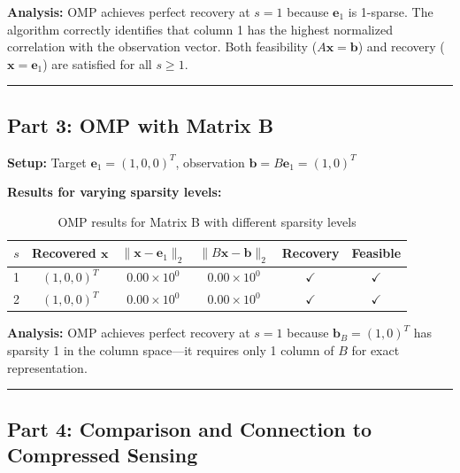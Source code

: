\textbf{Analysis:} OMP achieves perfect recovery at $s=1$ because $\mathbf{e}_1$ is 1-sparse. The algorithm correctly identifies that column 1 has the highest normalized correlation with the observation vector. Both feasibility ($A\mathbf{x} = \mathbf{b}$) and recovery ($\mathbf{x} = \mathbf{e}_1$) are satisfied for all $s \geq 1$.

\vspace{2em}
\noindent\rule{\textwidth}{0.4pt}

\clearpage
\subsection*{Part 3: OMP with Matrix B}

\textbf{Setup:} Target $\mathbf{e}_1 = (1, 0, 0)^T$, observation $\mathbf{b} = B\mathbf{e}_1 = (1, 0)^T$

\textbf{Results for varying sparsity levels:}

\begin{table}[h]
\centering
\begin{tabular}{cccccc}
\toprule
$s$ & Recovered $\mathbf{x}$ & $\|\mathbf{x} - \mathbf{e}_1\|_2$ & $\|B\mathbf{x} - \mathbf{b}\|_2$ & Recovery & Feasible \\
\midrule
1 & $(1, 0, 0)^T$ & $0.00 \times 10^{0}$ & $0.00 \times 10^{0}$ & $\checkmark$ & $\checkmark$ \\
2 & $(1, 0, 0)^T$ & $0.00 \times 10^{0}$ & $0.00 \times 10^{0}$ & $\checkmark$ & $\checkmark$ \\
\bottomrule
\end{tabular}
\caption{OMP results for Matrix B with different sparsity levels}
\end{table}

\textbf{Analysis:} OMP achieves perfect recovery at $s=1$ because $\mathbf{b}_B = (1, 0)^T$ has sparsity 1 in the column space—it requires only 1 column of $B$ for exact representation.

\vspace{2em}
\noindent\rule{\textwidth}{0.4pt}

\clearpage
\subsection*{Part 4: Comparison and Connection to Compressed Sensing}

